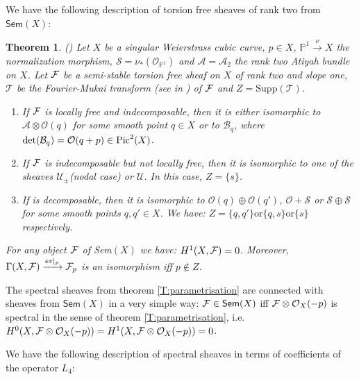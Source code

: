 \documentclass[11pt]{article}
\theoremstyle{definition}
\newcommand{\Pic}{\mathop {\rm Pic}}
\theoremstyle{plain}
\newtheorem{theorem}{Theorem}[section]
\numberwithin{equation}{section}
\newcommand{\co}{{{\cal O}}}
\newcommand{\cf}{{{\cal F}}}
\begin{document}
We have the following description of torsion free sheaves of rank two from $\mathsf{Sem}(X)$:

\begin{theorem}{(\cite[Cor 2.10]{BZ})}
	Let $X$ be a singular Weierstrass  cubic curve, $p\in X$, $\mathbb{P}^1\xrightarrow{\nu}X$ the normalization morphism, $\mathcal{S}=\nu_{*}(\mathcal{O}_{\mathbb{P}^1})$ and $\mathcal{A}=\mathcal{A}_2$ the rank two Atiyah bundle on $X$. Let $\cf$ be a semi-stable torsion free sheaf on $X$ of rank two and slope one, $\mathcal{T}$ be the Fourier-Mukai transform (see in \cite{BZ}) of $\cf$ and $Z=\text{Supp}(\mathcal{T})$.
	\begin{enumerate}
		\item If $\cf$ is locally free and indecomposable, then it is either isomorphic to $\mathcal{A}\otimes \mathcal{O}(q)$ for some smooth point $q\in X$ or to $\mathcal{B}_{q}$, where $\det(\mathcal{B}_{q})=\mathcal{O}(q+p)\in \Pic^2 (X)$.
		\item If $\cf$ is  indecomposable but not locally free, then it is isomorphic to one of the sheaves $\mathcal{U}_{\pm}$(nodal case) or $\mathcal{U}$. In this case, $Z=\{s\}$.
		\item If is decomposable, then it is isomorphic to $\mathcal{O}(q)\oplus \mathcal{O}(q')$, $\mathcal{O}+\mathcal{S}$ or $\mathcal{S}\oplus \mathcal{S}$ for some smooth points $q,q'\in X$. We have: $Z=\{q,q'\}\text{or} \{q,s\}\text{or} \{s\}$ respectively.
	\end{enumerate}
	For any object $\cf$ of Sem$(X)$ we have: $H^1(X,\cf)=0$. Moreover, $\Gamma(X,\cf)\xrightarrow{ev|_p}\cf_p$ is an isomorphism iff $p\notin Z$.
\end{theorem}

The spectral sheaves from theorem \ref{T:parametrisation} are connected with sheaves from $\mathsf{Sem}(X)$ in a very simple way: $\cf\in \mathsf{Sem}(X)$ iff $\cf\otimes \co_X(-p)$ is spectral in the sense of theorem \ref{T:parametrisation}, i.e. $H^0(X, \cf\otimes \co_X(-p))=H^1(X, \cf\otimes \co_X(-p))=0$. 

We have the following description of spectral sheaves in terms of coefficients of the operator $L_4$:
\end{document}
